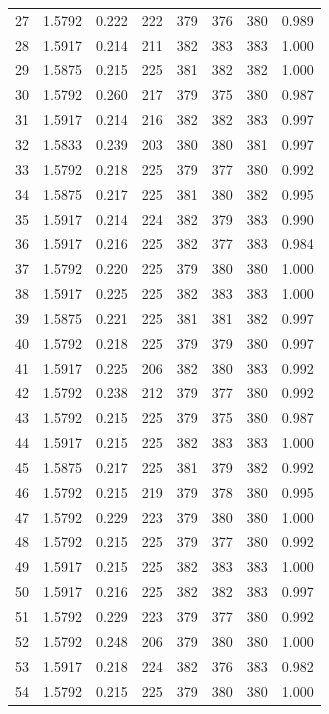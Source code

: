 \documentclass[10pt]{article}
\begin{document}
\begin{longtable}{rrrrrrrr}
27 & 1.5792 & 0.222 & 222 & 379 & 376 & 380 & 0.989\\
28 & 1.5917 & 0.214 & 211 & 382 & 383 & 383 & 1.000\\
29 & 1.5875 & 0.215 & 225 & 381 & 382 & 382 & 1.000\\
30 & 1.5792 & 0.260 & 217 & 379 & 375 & 380 & 0.987\\
31 & 1.5917 & 0.214 & 216 & 382 & 382 & 383 & 0.997\\
32 & 1.5833 & 0.239 & 203 & 380 & 380 & 381 & 0.997\\
33 & 1.5792 & 0.218 & 225 & 379 & 377 & 380 & 0.992\\
34 & 1.5875 & 0.217 & 225 & 381 & 380 & 382 & 0.995\\
35 & 1.5917 & 0.214 & 224 & 382 & 379 & 383 & 0.990\\
36 & 1.5917 & 0.216 & 225 & 382 & 377 & 383 & 0.984\\
37 & 1.5792 & 0.220 & 225 & 379 & 380 & 380 & 1.000\\
38 & 1.5917 & 0.225 & 225 & 382 & 383 & 383 & 1.000\\
39 & 1.5875 & 0.221 & 225 & 381 & 381 & 382 & 0.997\\
40 & 1.5792 & 0.218 & 225 & 379 & 379 & 380 & 0.997\\
41 & 1.5917 & 0.225 & 206 & 382 & 380 & 383 & 0.992\\
42 & 1.5792 & 0.238 & 212 & 379 & 377 & 380 & 0.992\\
43 & 1.5792 & 0.215 & 225 & 379 & 375 & 380 & 0.987\\
44 & 1.5917 & 0.215 & 225 & 382 & 383 & 383 & 1.000\\
45 & 1.5875 & 0.217 & 225 & 381 & 379 & 382 & 0.992\\
46 & 1.5792 & 0.215 & 219 & 379 & 378 & 380 & 0.995\\
47 & 1.5792 & 0.229 & 223 & 379 & 380 & 380 & 1.000\\
48 & 1.5792 & 0.215 & 225 & 379 & 377 & 380 & 0.992\\
49 & 1.5917 & 0.215 & 225 & 382 & 383 & 383 & 1.000\\
50 & 1.5917 & 0.216 & 225 & 382 & 382 & 383 & 0.997\\
51 & 1.5792 & 0.229 & 223 & 379 & 377 & 380 & 0.992\\
52 & 1.5792 & 0.248 & 206 & 379 & 380 & 380 & 1.000\\
53 & 1.5917 & 0.218 & 224 & 382 & 376 & 383 & 0.982\\
54 & 1.5792 & 0.215 & 225 & 379 & 380 & 380 & 1.000\\

\end{longtable}
\end{document}
